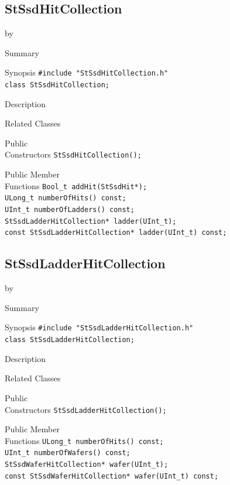 \documentclass[twoside]{article}
\newcommand{\entrylabel}[1]{\mbox{\textbf{{#1}}}\hfil}%
\newenvironment{entry}
{\begin{list}{}%
    {\renewcommand{\makelabel}{\entrylabel}%
     \setlength{\labelwidth}{90pt}%
     \setlength{\leftmargin}{\labelwidth}
     \advance\leftmargin by \labelsep%
      }%
    }%
  {\end{list}}
\newcommand{\Entrylabel}[1]%
{\raisebox{0pt}[1ex][0pt]{\makebox[\labelwidth][l]%
    {\parbox[t]{\labelwidth}{\hspace{0pt}\textbf{{#1}}}}}}
\newenvironment{Entry}%
{\renewcommand{\entrylabel}{\Entrylabel}\begin{entry}}%
  {\end{entry}}
\begin{document}
\subsection{StSsdHitCollection}
\label{sec:StSsdHitCollection}
\begin{Entry}
\item[Summary]
\item[Synopsis]
    \verb+#include "StSsdHitCollection.h"+\\
    \verb+class StSsdHitCollection;+\\
\item[Description]
\item[Related Classes]
\item[Public\\ Constructors]
    \verb+StSsdHitCollection();+\\
\item[Public Member\\ Functions]
    \verb+Bool_t addHit(StSsdHit*);+\\
    \verb+ULong_t numberOfHits() const;+\\
    \verb+UInt_t numberOfLadders() const;+\\
    \verb+StSsdLadderHitCollection* ladder(UInt_t);+\\
    \verb+const StSsdLadderHitCollection* ladder(UInt_t) const;+\\
\end{Entry}
\clearpage

\subsection{StSsdLadderHitCollection}
\label{sec:StSsdLadderHitCollection}
\begin{Entry}
\item[Summary]
\item[Synopsis]
    \verb+#include "StSsdLadderHitCollection.h"+\\
    \verb+class StSsdLadderHitCollection;+\\
\item[Description]
\item[Related Classes]
\item[Public\\ Constructors]
    \verb+StSsdLadderHitCollection();+\\
\item[Public Member\\ Functions]
    \verb+ULong_t numberOfHits() const;+\\
    \verb+UInt_t numberOfWafers() const;+\\
    \verb+StSsdWaferHitCollection* wafer(UInt_t);+\\
    \verb+const StSsdWaferHitCollection* wafer(UInt_t) const;+\\
\end{Entry}
\clearpage
\end{document}
